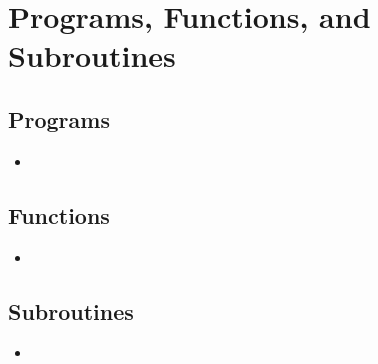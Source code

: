 \section{Programs, Functions, and Subroutines}
\makesubcontentsslides


\subsection{Programs}

\begin{frame}
  \begin{block}{}\pause
  \begin{itemize}
    \item 
  \end{itemize}
  \end{block}
\end{frame}





\subsection{Functions}

\begin{frame}
  \begin{block}{}\pause
  \begin{itemize}
    \item 
  \end{itemize}
  \end{block}
\end{frame}





\subsection{Subroutines}

\begin{frame}
  \begin{block}{}\pause
  \begin{itemize}
    \item 
  \end{itemize}
  \end{block}
\end{frame}
